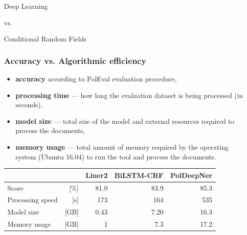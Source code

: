 \documentclass[Warsaw]{beamer}
\begin{document}


\begin{frame}
    \begin{center}
        \Huge
        Deep Learning
        
        \normalsize
        vs.
        
        \Huge
        Conditional Random Fields
        
    \end{center}
\end{frame}


\begin{frame}
    \frametitle{Accuracy vs. Algorithmic efficiency}
    \begin{itemize}
        \item \textbf{accuracy} according to PolEval evaluation procedure, 
        \item \textbf{processing time} --- how long the evaluation dataset is being processed (in seconds), 
        \item \textbf{model size} --- total size of the model and external resources required to process the documents,
        \item \textbf{memory usage} --- total amount of memory required by the operating system (Ubuntu 16.04) to run the tool and process the documents.
    \end{itemize}
    
\begin{table}[ht]
\tiny
    \centering
    \bgroup
    \def\arraystretch{1.2}%
    \begin{tabular}{lr|r|r|r}
                         &     &  \textbf{Liner2} & \textbf{BiLSTM-CRF} & \textbf{PolDeepNer} \\
        \hline
        \hline
        Score                  & [\%] &  81.0   &  83.9 & 85.3 \\
        \hline
        Processing speed       & [s]  &  173    &  164  & 535 \\
        \hline
        Model size             & [GB] &  0.43  & 7.20  &  16.3 \\
        \hline
        Memory usage           & [GB] & 1       & 7.3   & 17.2 \\
    \end{tabular}
    \egroup
    \label{tab:comparision}
\end{table}    
\end{frame}
\end{document}
